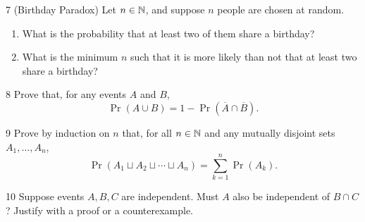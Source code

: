 \begin{exercise}{7}
    (Birthday Paradox) Let $n\in\mathbb{N}$, and suppose $n$ people are chosen at random.
    \begin{enumerate}[label=(\alph*)]
        \item What is the probability that at least two of them share a
              birthday?
        \item What is the minimum $n$ such that it is more likely than not that
              at least two share a birthday?
    \end{enumerate}
\end{exercise}

\begin{exercise}{8}
    Prove that, for any events $A$ and $B$,
    \[
        \Pr(A\cup B) = 1-\Pr(\overline A\cap\overline B).
    \]
\end{exercise}

\begin{exercise}{9}
    Prove by induction on $n$ that, for all $n\in\mathbb{N}$ and any mutually disjoint
    sets $A_1,\dots,A_n$,
    \[
        \Pr(A_1\sqcup A_2\sqcup\cdots\sqcup A_n) = \sum_{k=1}^n\Pr(A_k).
    \]
\end{exercise}

\begin{exercise}{10}
    Suppose events $A,B,C$ are independent. Must $A$ also be independent of
    $B\cap C$? Justify with a proof or a counterexample.
\end{exercise}

